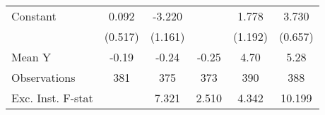 {\begin{tabular}{l*{5}{c}}
\addlinespace
Constant            &       0.092         &      -3.220\sym{**} &                     &       1.778         &       3.730\sym{***}\\
                    &     (0.517)         &     (1.161)         &                     &     (1.192)         &     (0.657)         \\
\midrule
Mean Y              &       -0.19         &       -0.24         &       -0.25         &        4.70         &        5.28         \\
Observations        &         381         &         375         &         373         &         390         &         388         \\
Exc. Inst. F-stat   &                     &       7.321         &       2.510         &       4.342         &      10.199         \\
\bottomrule
\end{tabular}
}

